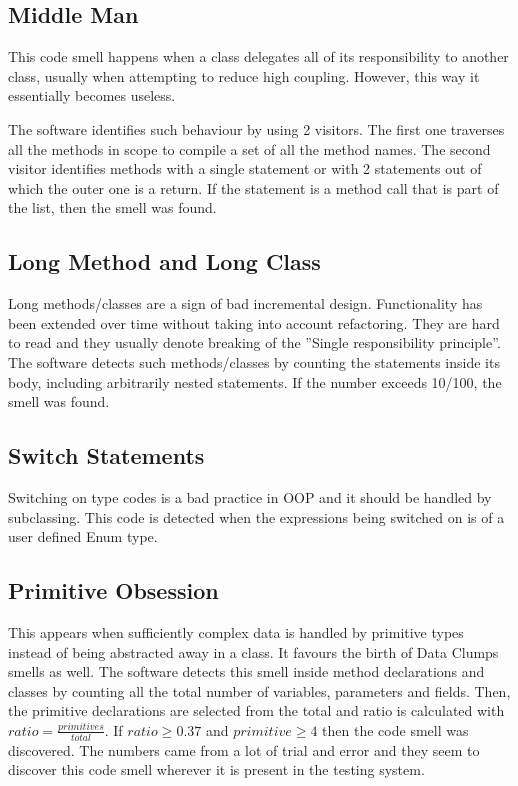 \documentclass[a4paper]{article}
\begin{document}
\subsection{Middle Man}
This code smell happens when a class delegates all of its responsibility to
another class, usually when attempting to reduce high coupling. However, this
way it essentially becomes useless.

The software identifies such behaviour by using 2 visitors.
The first one traverses all the methods in scope to compile a set of all the
method names.
The second visitor identifies methods with a single statement or with 2
statements
out of which the outer one is a return.
If the statement is a method call that is part of the list, then the smell was
found.

\subsection{Long Method and Long Class}
Long methods/classes are a sign of bad incremental design.
Functionality has been
extended over time without taking into account refactoring.
They are hard to read and they usually denote breaking of the
''Single responsibility principle''.
The software detects such methods/classes by counting the statements inside its
body, including arbitrarily nested statements.
If the number exceeds 10/100, the smell was found.

\subsection{Switch Statements}
Switching on type codes is a bad practice in OOP and it should be handled by
subclassing.
This code is detected when the expressions being switched on is of
a user defined Enum type.

\subsection{Primitive Obsession}
This appears when sufficiently complex data is handled by primitive types
instead of being abstracted away in a class.
It favours the birth of Data Clumps smells as well.
The software detects this smell inside method declarations and classes by
counting all the total number of variables, parameters and fields.
Then, the primitive declarations are selected from the total and ratio
is calculated with $ratio=\frac{primitives}{total}$.
If $ratio \geq 0.37$ and $primitive \geq 4$ then the code smell was discovered.
The numbers came from a lot of trial and error and they seem to discover this
code smell wherever it is present in the testing system.
\end{document}
